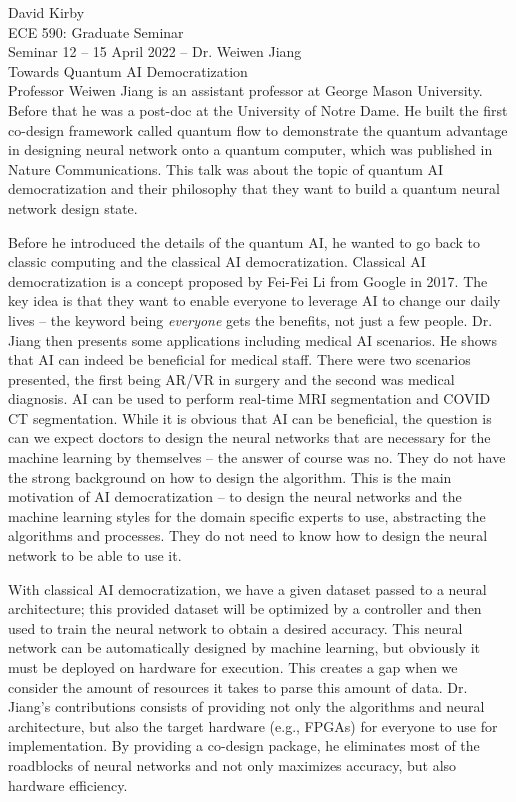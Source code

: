 \documentclass[11pt]{article}
\begin{document}
\setmainfont{Times New Roman}
\setsansfont{Times New Roman}
\setmonofont{Times New Roman}
\renewcommand{\familydefault}{\sfdefault}

\hypersetup{
    linkcolor=CrispBlue,
    urlcolor=CrispBlue,
    breaklinks=true
}

\noindent David Kirby\\
ECE 590: Graduate Seminar\\
Seminar 12 -- 15 April 2022 -- Dr. Weiwen Jiang\\
Towards Quantum AI Democratization\\

Professor Weiwen Jiang is an assistant professor at George Mason University. Before that he was a post-doc at the University of Notre Dame. He built the first co-design framework called quantum flow to demonstrate the quantum advantage in designing neural network onto a quantum computer, which was published in Nature Communications. This talk was about the topic of quantum AI democratization and their philosophy that they want to build a quantum neural network design state.

Before he introduced the details of the quantum AI, he wanted to go back to classic computing and the classical AI democratization. Classical AI democratization is a concept proposed by Fei-Fei Li from Google in 2017. The key idea is that they want to enable everyone to leverage AI to change our daily lives -- the keyword being \textit{everyone} gets the benefits, not just a few people. Dr. Jiang then presents some applications including medical AI scenarios. He shows that AI can indeed be beneficial for medical staff. There were two scenarios presented, the first being AR/VR in surgery and the second was medical diagnosis. AI can be used to perform real-time MRI segmentation and COVID CT segmentation. While it is obvious that AI can be beneficial, the question is can we expect doctors to design the neural networks that are necessary for the machine learning by themselves -- the answer of course was no. They do not have the strong background on how to design the algorithm. This is the main motivation of AI democratization -- to design the neural networks and the machine learning styles for the domain specific experts to use, abstracting the algorithms and processes. They do not need to know how to design the neural network to be able to use it.

With classical AI democratization, we have a given dataset passed to a neural architecture; this provided dataset will be optimized by a controller and then used to train the neural network to obtain a desired accuracy. This neural network can be automatically designed by machine learning, but obviously it must be deployed on hardware for execution. This creates a gap when we consider the amount of resources it takes to parse this amount of data. Dr. Jiang's contributions consists of providing not only the algorithms and neural architecture, but also the target hardware (e.g., FPGAs) for everyone to use for implementation. By providing a co-design package, he eliminates most of the roadblocks of neural networks and not only maximizes accuracy, but also hardware efficiency.
\end{document}
